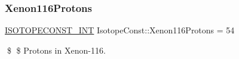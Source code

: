 \subsubsection{\texorpdfstring{Xenon116\+Protons}{Xenon116Protons}}
{\footnotesize\ttfamily \mbox{\hyperlink{group___isotope_const-_macros_ga5f18360b3e99483a35c32d789e62621c}{I\+S\+O\+T\+O\+P\+E\+C\+O\+N\+S\+T\+\_\+\+I\+NT}} Isotope\+Const\+::\+Xenon116\+Protons = 54}

\$ \$ Protons in Xenon-\/116. 
